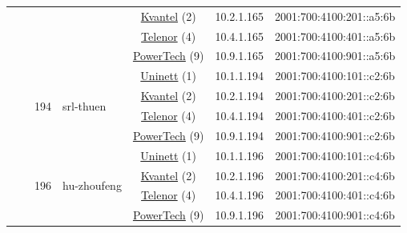 \begin{small}
\begin{center}
\begin{longtable}{|c|c|c|c|c|c|c|c|}
  &  &  &  & \multicolumn{2}{|c|}{\tiny{\href{http://kvantel.no}{Kvantel} (2)}} & \tiny{10.2.1.165} & \tiny{2001:700:4100:201::a5:6b} \\* \cline{5-5}\cline{6-6}\cline{7-7}\cline{8-8}
  &  &  &  & \multicolumn{2}{|c|}{\tiny{\href{https://www.telenor.no}{Telenor} (4)}} & \tiny{10.4.1.165} & \tiny{2001:700:4100:401::a5:6b} \\* \cline{5-5}\cline{6-6}\cline{7-7}\cline{8-8}
  &  &  &  & \multicolumn{2}{|c|}{\tiny{\href{http://www.powertech.no}{PowerTech} (9)}} & \tiny{10.9.1.165} & \tiny{2001:700:4100:901::a5:6b} \\* \cline{3-3}\cline{4-4}\cline{5-5}\cline{6-6}\cline{7-7}\cline{8-8}
  &  & \multirow{4}{*}{\tiny{194}} & \multicolumn{1}{|l|}{\multirow{4}{*}{\tiny{srl-thuen}}} & \multicolumn{2}{|c|}{\tiny{\href{https://www.uninett.no}{Uninett} (1)}} & \tiny{10.1.1.194} & \tiny{2001:700:4100:101::c2:6b} \\* \cline{5-5}\cline{6-6}\cline{7-7}\cline{8-8}
  &  &  &  & \multicolumn{2}{|c|}{\tiny{\href{http://kvantel.no}{Kvantel} (2)}} & \tiny{10.2.1.194} & \tiny{2001:700:4100:201::c2:6b} \\* \cline{5-5}\cline{6-6}\cline{7-7}\cline{8-8}
  &  &  &  & \multicolumn{2}{|c|}{\tiny{\href{https://www.telenor.no}{Telenor} (4)}} & \tiny{10.4.1.194} & \tiny{2001:700:4100:401::c2:6b} \\* \cline{5-5}\cline{6-6}\cline{7-7}\cline{8-8}
  &  &  &  & \multicolumn{2}{|c|}{\tiny{\href{http://www.powertech.no}{PowerTech} (9)}} & \tiny{10.9.1.194} & \tiny{2001:700:4100:901::c2:6b} \\* \cline{3-3}\cline{4-4}\cline{5-5}\cline{6-6}\cline{7-7}\cline{8-8}
  &  & \multirow{4}{*}{\tiny{196}} & \multicolumn{1}{|l|}{\multirow{4}{*}{\tiny{hu-zhoufeng}}} & \multicolumn{2}{|c|}{\tiny{\href{https://www.uninett.no}{Uninett} (1)}} & \tiny{10.1.1.196} & \tiny{2001:700:4100:101::c4:6b} \\* \cline{5-5}\cline{6-6}\cline{7-7}\cline{8-8}
  &  &  &  & \multicolumn{2}{|c|}{\tiny{\href{http://kvantel.no}{Kvantel} (2)}} & \tiny{10.2.1.196} & \tiny{2001:700:4100:201::c4:6b} \\* \cline{5-5}\cline{6-6}\cline{7-7}\cline{8-8}
  &  &  &  & \multicolumn{2}{|c|}{\tiny{\href{https://www.telenor.no}{Telenor} (4)}} & \tiny{10.4.1.196} & \tiny{2001:700:4100:401::c4:6b} \\* \cline{5-5}\cline{6-6}\cline{7-7}\cline{8-8}
  &  &  &  & \multicolumn{2}{|c|}{\tiny{\href{http://www.powertech.no}{PowerTech} (9)}} & \tiny{10.9.1.196} & \tiny{2001:700:4100:901::c4:6b} \\* \cline{3-3}\cline{4-4}\cline{5-5}\cline{6-6}\cline{7-7}\cline{8-8}

\end{longtable}
\end{center}
\end{small}
